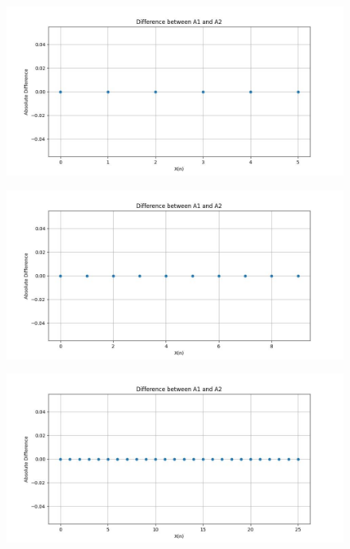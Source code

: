 \documentclass{article}
\begin{document}
\begin{figure}
    \centering
    \includegraphics[width=1\linewidth]{h1_plot_7.jpg}
    \label{fig:enter-label}
\end{figure}

\begin{figure}
    \centering
    \includegraphics[width=1\linewidth]{h1_plot_8.jpg}
    \label{fig:enter-label}
\end{figure}

\begin{figure}
    \centering
    \includegraphics[width=1\linewidth]{h1_plot_9.jpg}
    \label{fig:enter-label}
\end{figure}
\end{document}
